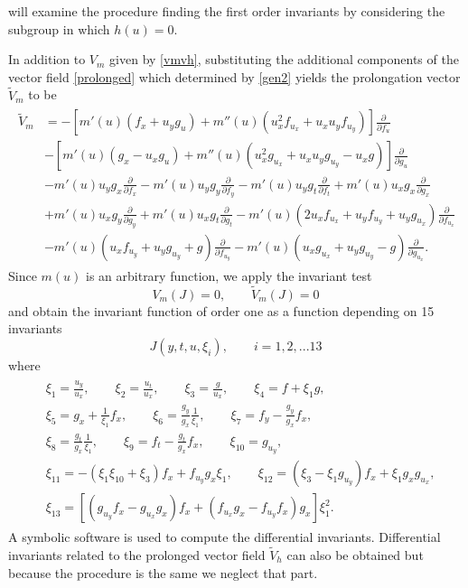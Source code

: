 \documentclass[a4paper]{article}
\def\bea{\begin{eqnarray}}
\def\eea{\end{eqnarray}}
\begin{document}
will examine the procedure finding the first order invariants by
considering the subgroup in which $h(u)=0$.
\par 
 In addition to $V_m$ given by
\eqref{vmvh}, substituting the additional components of the vector field \eqref{prolonged} which determined by \eqref{gen2} yields the
prolongation vector $\tilde {V}_m$ to be
 \bea
\begin{split}
\widetilde{V}_m &=
-\left[m'(u)\left(f_x+u_yg_u\right)+m''(u)\left(u_x^2f_{u_x}+u_xu_yf_{u_y}\right)\right]\frac{\partial
}{{\partial f_u }}\\
&- \left[m'(u)\left(g_x-u_x g_u\right)+m''(u)\left(u_x^2g_{u_x}+u_xu_y g_{u_y}-u_x g\right)\right] \frac{\partial}{\partial g_u}\\
&-m'(u)u_yg_x \frac{\partial}{\partial f_x}-m'(u)u_yg_y
\frac{\partial}{\partial f_y}-m'(u)u_yg_t \frac{\partial}{\partial f_t}+m'(u)u_xg_x \frac{\partial}{\partial g_x}\\
&+ m'(u) u_xg_y \frac{\partial }{\partial g_y}+m'(u) u_xg_t
\frac{\partial }{\partial g_t}-m'(u)\left(2
u_xf_{u_x}+u_yf_{u_y}+u_yg_{u_x}\right) \frac{\partial}{\partial
f_{u_x}}\\
&-m'(u)\left( u_xf_{u_y}+u_yg_{u_y}+g\right)\frac{\partial}{\partial
f_{u_y}} -m'(u)\left( u_xg_{u_x}+u_yg_{u_y}-g\right)
\frac{\partial}{\partial g_{u_x}}.
\end{split}
  \eea
  Since $m(u)$ is an arbitrary function, we apply the invariant test $$V_m(J)=0,\qquad
  \widetilde{V}_m(J)=0$$  and obtain the  invariant function of order one as a function depending on 15 invariants
    $$J(y,t,u,\xi_i),\qquad i=1,2,...13$$
    where
    \bea
  \begin{split}
& \xi_1=\frac{u_y}{u_x},\qquad \xi_2=\frac{u_t}{u_x},\qquad
\xi_3=\frac{g}{u_x},\qquad
 \xi_4=f+\xi_1 g,\\
& \xi_5=g_x+\frac{1}{\xi_1}f_x,\qquad
\xi_6=\frac{g_y}{g_x}\frac{1}{\xi_1},\qquad
\xi_7=f_y-\frac{g_y}{g_x}f_x,\\&
\xi_8=\frac{g_t}{g_x}\frac{1}{\xi_1},\qquad
 \xi_9=f_t-\frac{g_t}{g_x}f_x,\qquad  \xi_{10}=g_{u_y}, \\
&
\xi_{11}=-(\xi_1\xi_{10}+\xi_3)f_x+f_{u_y}g_x \xi_1,\qquad \xi_{12}=(\xi_3-\xi_1g_{u_y})f_x+\xi_1g_xg_{u_x},\\
&\xi_{13}=\left[\left(g_{u_y}f_{x}- g_{u_x}g_{x}\right)f_x+\left(f_{u_x}g_{x}-f_{u_y}f_x\right)g_{x}\right]\xi_1^2.
  \end{split}
  \eea
 A symbolic software is used to compute the differential invariants. Differential invariants related to the prolonged vector field $\tilde V_h$ can also be obtained but because the procedure is the same we neglect that part. 
\end{document}

